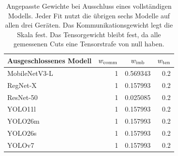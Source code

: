 \begin{table}[t]
\centering
\small
\caption{Angepasste Gewichte bei Ausschluss eines vollständigen Modells. Jeder Fit nutzt die übrigen sechs Modelle auf allen drei Geräten. Das Kommunikationsgewicht legt die Skala fest. Das Tensorgewicht bleibt fest, da alle gemessenen Cuts eine Tensorstrafe von null haben.}
\label{tab:weighted-folds}
\begin{tabular}{@{}lrD{.}{.}{6}D{.}{.}{1}@{}}
\toprule
Ausgeschlossenes Modell & {$w_{\rm comm}$} &  &  \\
\midrule
MobileNetV3-L & 1 & 0.569343 & 0.2 \\
RegNet-X & 1 & 0.157993 & 0.2 \\
ResNet-50 & 1 & 0.025085 & 0.2 \\
YOLO11l & 1 & 0.157993 & 0.2 \\
YOLO26m & 1 & 0.157993 & 0.2 \\
YOLO26s & 1 & 0.157993 & 0.2 \\
YOLOv7 & 1 & 0.157993 & 0.2 \\
\bottomrule
\end{tabular}
\end{table}
